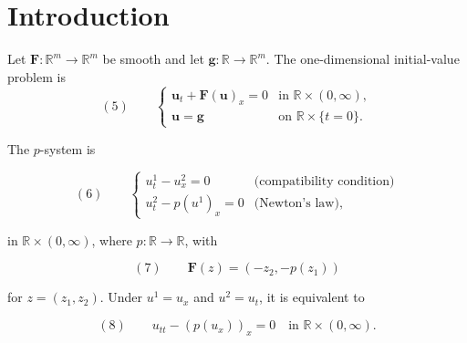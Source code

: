 
\section{Introduction}\label{sec:conservation-laws-introduction}

Let $\mathbf F:\mathbb R^m\to\mathbb R^m$ be smooth and let
$\mathbf g:\mathbb R\to\mathbb R^m$. The one-dimensional initial-value problem is
\[
(5)\qquad
\begin{cases}
\mathbf u_t+\mathbf F(\mathbf u)_x=0 & \text{in }\mathbb R\times(0,\infty),\\
\mathbf u=\mathbf g & \text{on }\mathbb R\times\{t=0\}.
\end{cases}
\]

\begin{example}
\label{ex:p-system-definition}
The $p$-system is

$$(6) \qquad \begin{cases} u^1_t - u^2_x = 0 & \text{(compatibility condition)} \\ u^2_t - p(u^1)_x = 0 & \text{(Newton's law)}, \end{cases}$$

in $\mathbb{R}\times(0,\infty)$, where $p:\mathbb{R}\to\mathbb{R}$, with

$$(7) \qquad \mathbf{F}(z) = (-z_2, -p(z_1))$$

for $z=(z_1,z_2)$. Under $u^1=u_x$ and $u^2=u_t$, it is equivalent to

$$(8) \qquad u_{tt} - (p(u_x))_x = 0 \quad \text{in } \mathbb{R}\times(0,\infty).$$

\end{example}

